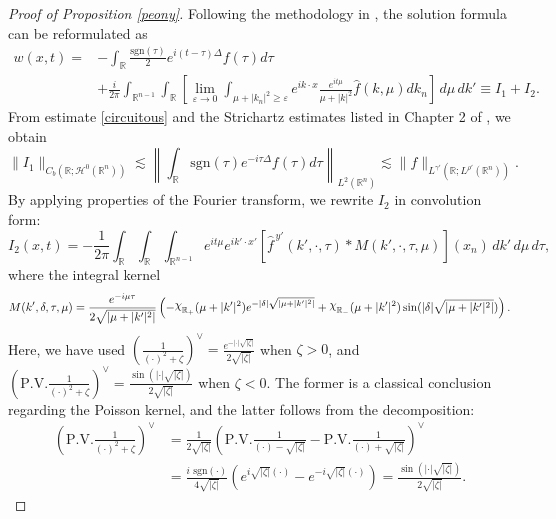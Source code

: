 \documentclass[preprint,compress,12pt]{elsarticle}
\numberwithin{equation}{section}
\begin{document}
\begin{proof}[Proof of Proposition \ref{peony}]
	Following the methodology in \cite{kenig,chatter}, the solution formula can be reformulated as
	\begin{equation}
		\begin{aligned}
			w(x,t)=&-\int_{\mathbb{R}} \frac{\text{sgn}(\tau)}{2} e^{i(t-\tau)\Delta}f(\tau)d\tau\\
			&+\frac{i}{2\pi}\int_{\mathbb{R}^{n-1}} \int_{\mathbb{R}}\left[\lim_{\varepsilon\rightarrow0}\int_{\mu+|k_{n}|^{2}\geq\varepsilon}e^{ik\cdot x}\frac{e^{it\mu}}{\mu+|k|^{2}}\widehat{f}(k,\mu)dk_{n}\right]\,d\mu\, dk'
			\equiv I_{1}+I_{2}.
		\end{aligned}
	\end{equation}
	From estimate \eqref{circuitous} and the Strichartz estimates listed in Chapter 2 of \cite{facetious}, we obtain
	\begin{equation}
		\|I_{1}\|_{C_{b}(\mathbb{R};\mathcal{H}^{0}(\mathbb{R}^{n}))}\lesssim \left\|\int_{\mathbb{R}} \text{sgn}(\tau) e^{-i\tau\Delta}f(\tau)d\tau\right\|_{L^{2}(\mathbb{R}^{n})}\lesssim  \|f\|_{L^{\gamma'}(\mathbb{R};L^{\rho'}(\mathbb{R}^{n}))}.
	\end{equation}
	By applying properties of the Fourier transform, we rewrite $I_{2}$ in convolution form:
	\begin{equation}\label{kee}
		I_{2}(x,t)=	-\frac{1}{2\pi}  \int_{\mathbb{R}} \int_{\mathbb{R}} \int_{\mathbb{R}^{n-1}}e^{it\mu}e^{ik'\cdot x'}\left[\widehat{f}^{\,y'}(k',\cdot,\tau)\ast M(k',\cdot,\tau,\mu) \right](x_{n})\,dk'\,d\mu\, d\tau,
	\end{equation}
	where the integral kernel
	{\small	\begin{equation*}
			M(k',\delta,\tau,\mu)=\frac{e^{-i\mu \tau}}{2\sqrt{\left|\mu+|k'|^{2}\right|}}	\left(-\raisebox{0.5ex}{$\chi$}_{\mathbb{R}_{+}}(\mu+|k'|^{2})e^{-|\delta|\sqrt{\left|\mu+|k'|^{2}\right|}}+\raisebox{0.5ex}{$\chi$}_{\mathbb{R}_{-}}(\mu+|k'|^{2})\sin(|\delta|\sqrt{|\mu+|k'|^{2}|} )\right).
	\end{equation*}}
	Here, we have used $\left(\tfrac{1}{(\cdot)^{2}+\zeta}\right)^{\vee}=\tfrac{e^{-|\cdot|\sqrt{|\zeta|}}}{2\sqrt{|\zeta|}}$ when $\zeta>0$, and  $\left(\text{P.V.}\tfrac{1}{(\cdot)^{2}+\zeta}\right)^{\vee}=\tfrac{\sin\left(|\cdot|\sqrt{|\zeta|}\right)}{2\sqrt{|\zeta|}}$ when $\zeta<0$. The former is a classical conclusion regarding the Poisson kernel, and the latter  follows from the decomposition:
	\begin{equation*}
		\begin{aligned}
			\left(\text{P.V.}\tfrac{1}{(\cdot)^{2}+\zeta}\right)^{\vee} &= \tfrac{1}{2\sqrt{|\zeta|}} \left(\text{P.V.} \tfrac{1}{(\cdot)-\sqrt{|\zeta|}}-\text{P.V.}\tfrac{1}{(\cdot)+\sqrt{|\zeta|}}\right)^{\vee}\\
			&=\tfrac{i\text{ sgn}\left(\cdot\right)}{4\sqrt{|\zeta|}}  \left(e^{i\sqrt{|\zeta|}(\cdot)} -e^{-i\sqrt{|\zeta|}(\cdot)} \right)=\tfrac{\sin \left(|\cdot|\sqrt{|\zeta|}\right)}{2\sqrt{|\zeta|}}.
		\end{aligned}
	\end{equation*}
	

\end{proof}
\end{document}
